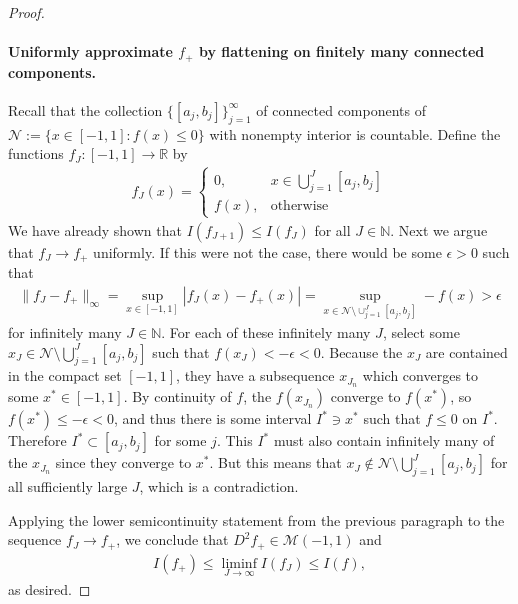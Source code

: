 \documentclass{article}
\def\cM{{\mathcal{M}}}
\def\cN{{\mathcal{N}}}
\def\bN{{\mathbb{N}}}
\newcommand{\R}{\mathbb{R}}
\begin{document}
\begin{appendices}
\begin{proof}
    \paragraph{Uniformly approximate $f_+$ by flattening on finitely many connected components.} Recall that the collection $\{ [a_j, b_j] \}_{j=1}^\infty$ of connected components of $\cN := \{x \in [-1,1]: f(x) \leq 0 \}$ with nonempty interior is countable. Define the functions $f_J: [-1,1] \to \R$ by
    \begin{align}
        f_J(x) = \begin{cases}
            0, &x \in \bigcup_{j=1}^J [a_j, b_j] \\
            f(x), &\textrm{otherwise}
        \end{cases}
    \end{align}
    We have already shown that $I(f_{J+1}) \leq I(f_J)$ for all $J \in \bN$. Next we argue that $f_J \to f_+$ uniformly. If this were not the case, there would be some $\epsilon > 0$ such that
    \begin{align}
        \| f_J - f_+ \|_\infty = \sup_{x \in [-1,1]} |f_J(x) - f_+(x)| = \sup_{x \in \cN \setminus \cup_{j=1}^J [a_j, b_j]} - f(x) > \epsilon
    \end{align}
    for infinitely many $J \in \bN$. For each of these infinitely many $J$, select some $x_J \in \cN \setminus \bigcup_{j=1}^J [a_j, b_j]$ such that $f(x_J) < - \epsilon < 0$. Because the $x_J$ are contained in the compact set $[-1,1]$, they have a subsequence $x_{J_n}$ which converges to some $x^* \in [-1,1]$. By continuity of $f$, the $f(x_{J_n})$ converge to $f(x^*)$, so $f(x^*) \leq -\epsilon < 0$, and thus there is some interval $I^* \ni x^*$ such that $f \leq 0$ on $I^*$. Therefore $I^* \subset [a_j, b_j]$ for some $j$. This $I^*$ must also contain infinitely many of the $x_{J_n}$ since they converge to $x^*$. But this means that $x_J \notin \cN \setminus \bigcup_{j=1}^J [a_j, b_j]$ for all sufficiently large $J$, which is a contradiction.
    
    Applying the lower semicontinuity statement from the previous paragraph to the sequence $f_J \to f_+$, we conclude that $D^2 f_+ \in \cM(-1,1)$ and
    \begin{align}
        I(f_+) \leq \liminf_{J \to \infty} I(f_J) \leq I(f),
    \end{align}
    as desired.
\end{proof}



\end{appendices}
\end{document}
